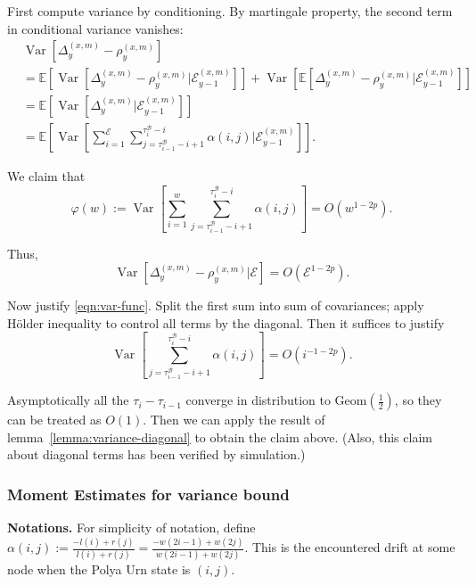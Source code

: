 First compute variance by conditioning. By martingale property, the second term in conditional variance vanishes:
 \begin{align*}
	  &\operatorname{Var} \left[ \Delta_y^{(x,m)} - \rho_y^{(x,m)}  \right]\\
	 &=  \mathbb{E} \left[\operatorname{Var} \left[ \Delta_y^{(x,m)} - \rho_y^{(x,m)} | \mathcal{E}_{y-1}^{(x,m) } \right]\right]
	 +  \operatorname{Var}\left[ \mathbb{E} \left[ \Delta_y^{(x,m)} - \rho_y^{(x,m)} | \mathcal{E}_{y-1}^{(x,m) } \right]\right]\\
	 &=  \mathbb{E} \left[\operatorname{Var} \left[ \Delta_y^{(x,m)} | \mathcal{E}_{y-1}^{(x,m) } \right]\right]\\
	 &= \mathbb{E}\left[ \operatorname{Var} \left[ 
	 \sum_{i = 1}^\mathcal{E} 
		\sum_{j = \tau_{i-1}^{\mathcal{B}}-i+1}^{\tau_i^{\mathcal{B}}-i}   
		\alpha(i, j) 
	 \bigg| \mathcal{E}_{y-1}^{(x,m)}
\right]  \right] 
.\end{align*}

We claim that
\begin{equation}
	\label{eqn:var-func}
	\varphi(w):=\operatorname{Var} \left[ \sum_{i = 1}^w 
		\sum_{j = \tau_{i-1}^{\mathcal{B}}-i+1}^{\tau_i^{\mathcal{B}}-i}   
		\alpha(i, j) 
\right] 
	= O(w^{1 - 2 p})
.\end{equation} 

Thus, 
\[
	  \operatorname{Var} \left[ \Delta_y^{(x,m)} - \rho_y^{(x,m)}  | \mathcal{E} \right]
	  = O(\mathcal{E}^{1 - 2 p})
.\] 

Now justify \eqref{eqn:var-func}.
Split the first sum into sum of covariances; apply Hölder inequality to control all terms by the diagonal. Then it suffices to justify
\[
	\operatorname{Var} \left[
		\sum_{j = \tau_{i-1}^{\mathcal{B}}-i+1}^{\tau_i^{\mathcal{B}}-i}   
		\alpha(i, j) 
\right] 
	= O\left( i^{-1-2p} \right) 
.\] 

Asymptotically all the $\tau_i - \tau_{i-1}$ converge in distribution to $\text{Geom}(\frac{1}{2})$, so they can be treated as $O(1)$. Then we can apply the result of lemma~\ref{lemma:variance-diagonal} to obtain the claim above. (Also, this claim about diagonal terms has been verified by simulation.)



\subsubsection{Moment Estimates for variance bound}


\textbf{Notations.} For simplicity of notation, define $\alpha(i,j) := \frac{- l(i) + r(j)}{l(i) + r(j)} = \frac{-w(2 i - 1) + w(2j)}{w(2i-1)+w(2j)}$. This is the encountered drift at some node when the Polya Urn state is $(i,j)$.


